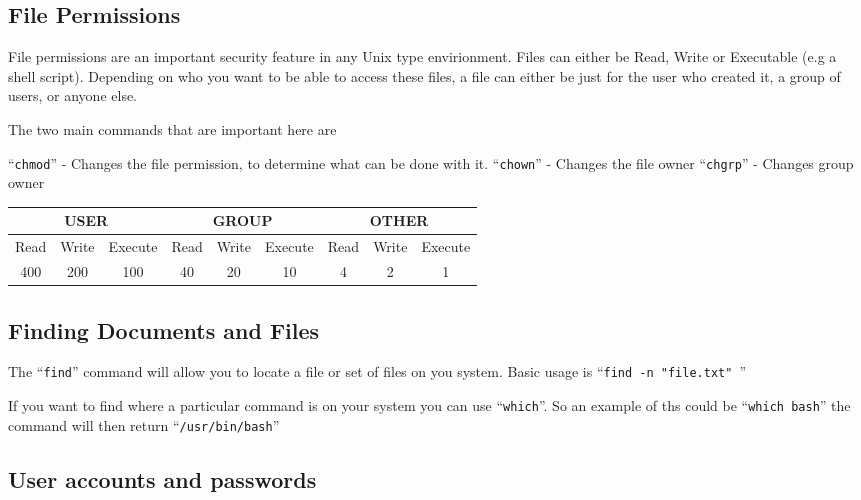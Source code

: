 \documentclass{extbook}
\begin{document}
\subsection{File Permissions}

File permissions are an important security feature in any Unix type envirionment.  Files can either be Read, Write or Executable (e.g a shell script).  Depending on who you want to be able to access these files,  a file can either be just for the user who created it, a group of users, or anyone else.  

The two main commands that are important here are

``\verb|chmod|'' - Changes the file permission, to determine what can be done with it. 
``\verb|chown|'' - Changes the file owner
``\verb|chgrp|'' - Changes group owner

\begin{table}[h]
\begin{tabular}{|ccc|ccc|ccc|}
\hline
\multicolumn{3}{|c|}{\textbf{USER}}                               & \multicolumn{3}{c|}{\textbf{GROUP}}                              & \multicolumn{3}{c|}{\textbf{OTHER}}                              \\ \hline
\multicolumn{1}{|c|}{Read} & \multicolumn{1}{c|}{Write} & Execute & \multicolumn{1}{c|}{Read} & \multicolumn{1}{c|}{Write} & Execute & \multicolumn{1}{c|}{Read} & \multicolumn{1}{c|}{Write} & Execute \\ \hline
\multicolumn{1}{|c|}{400}  & \multicolumn{1}{c|}{200}   & 100     & \multicolumn{1}{c|}{40}   & \multicolumn{1}{c|}{20}    & 10      & \multicolumn{1}{c|}{4}    & \multicolumn{1}{c|}{2}     & 1       \\ \hline
\end{tabular}
\end{table}


\subsection{Finding Documents and Files}

The ``\verb|find|'' command will allow you to locate a file or set of files on you system.  Basic usage is ``\verb|find -n "file.txt" |''

If you want to find where a particular command is on your system you can use ``\verb|which|''.  So an example of ths could be ``\verb|which bash|'' the command will then return ``\verb|/usr/bin/bash|''

\subsection{User accounts and passwords}
\end{document}
